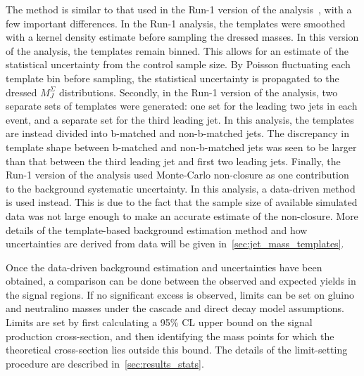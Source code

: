 The method is similar to that used in the Run-1 version of the analysis~\cite{run1-multijet}, with a few important differences.
In the Run-1 analysis, the templates were smoothed with a kernel density estimate before sampling the dressed masses.
In this version of the analysis, the templates remain binned.
This allows for an estimate of the statistical uncertainty from the control sample size.
By Poisson fluctuating each template bin before sampling, the statistical uncertainty is propagated to the dressed $M_J^{\Sigma}$ distributions.
Secondly, in the Run-1 version of the analysis, two separate sets of templates were generated: one set for the leading two jets in each event, and a separate set for the third leading jet.
In this analysis, the templates are instead divided into b-matched and non-b-matched jets.
The discrepancy in template shape between b-matched and non-b-matched jets was seen to be larger than that between the third leading jet and first two leading jets.
Finally, the Run-1 version of the analysis used Monte-Carlo non-closure as one contribution to the background systematic uncertainty.
In this analysis, a data-driven method is used instead.
This is due to the fact that the sample size of available simulated data was not large enough to make an accurate estimate of the non-closure.
More details of the template-based background estimation method and how uncertainties are derived from data will be given in~\ref{sec:jet_mass_templates}.

Once the data-driven background estimation and uncertainties have been obtained, a comparison can be done between the observed and expected yields in the signal regions.
If no significant excess is observed, limits can be set on gluino and neutralino masses under the cascade and direct decay model assumptions.
Limits are set by first calculating a 95\% CL upper bound on the signal production cross-section, and then identifying the mass points for which the theoretical cross-section lies outside this bound.
The details of the limit-setting procedure are described in~\ref{sec:results_stats}.
